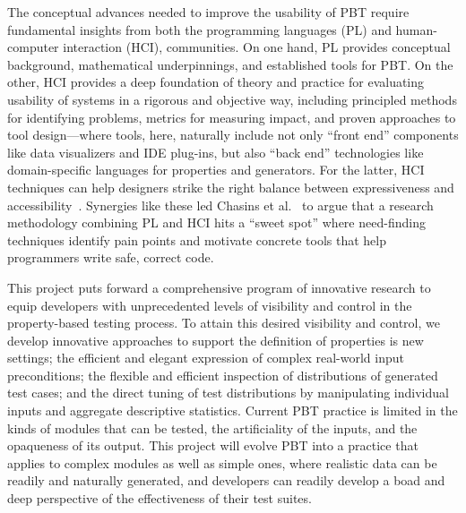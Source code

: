 The conceptual advances needed to improve the usability of PBT
require fundamental insights from both the
programming languages (PL) and human-computer interaction (HCI),
communities.
On one hand, PL provides conceptual background,
mathematical underpinnings, and established tools for PBT.  On the
other, HCI provides a deep foundation of theory and
practice for evaluating usability of systems in a
rigorous and objective way, including principled methods for
identifying problems, metrics for measuring impact, and proven
approaches to tool design---where tools, here, naturally include
not only ``front end'' components like
data visualizers and IDE plug-ins, but
also ``back end'' technologies like domain-specific languages for
properties and generators.  For the latter, HCI techniques
can help designers
strike the right balance between expressiveness and
accessibility~\cite{coblenz_pliers_2021,greenman_little_2022}.
Synergies like these led
Chasins et al.~\cite{chasins_pl_2021} to argue that a research
methodology combining PL and HCI hits a ``sweet spot'' where
need-finding techniques identify
pain points and motivate concrete tools that help programmers write
safe, correct code.

 This project puts forward a comprehensive program of innovative
research to equip developers with unprecedented levels of visibility and
control in the property-based testing process. To attain this desired
visibility and control, we develop innovative approaches to support the
definition of properties is new settings; the efficient and elegant expression
of complex real-world input preconditions; the flexible and efficient
inspection of distributions of generated test cases; and the direct tuning of
test distributions by manipulating individual inputs and aggregate descriptive
statistics. Current PBT practice is limited in the kinds of
modules that can be tested, the artificiality  of the inputs, and the opaqueness
of its output. This project will evolve PBT into a practice that applies to
complex modules as well as simple ones, where realistic data can be readily
and naturally generated, and developers can readily develop a boad and deep
perspective of the effectiveness of their test suites.


